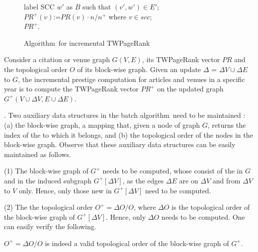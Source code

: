 \begin{figure}[tb!]
\begin{center}
{\begin{minipage}{3.36in}
{\icc\>\>\> label SCC $w'$ as $B$ such that $(v',w')\in E'$;\\
\icc\>\> \Else $PR^+(v)$:=$PR(v)\cdot {n}/{n^+}$ where $v\in scc$; \\
\icc\> \Return $PR^+$.
}
\vspace{-2.5ex} \myhrule
\end{minipage}
}
\end{center}
\vspace{-3ex}
\caption{\small Algorithm~\inctwprscc for incremental TWPageRank} \label{alg-inctwprscc}
\vspace{-3ex}
\end{figure}

Consider a citation or venue graph $G(V, E)$, its TWPageRank vector $PR$ and the topological order $O$ of its block-wise graph. Given an update $\Delta$ = $\Delta V\cup\Delta E$ to $G$, the incremental prestige computation for articles and venues in a specific year is to compute the TWPageRank vector $PR^+$ on the updated graph $G^+(V\cup\Delta V, E\cup\Delta E)$.


.
Two auxiliary data structures in the batch algorithm~\twprscc need to be maintained : (a) the block-wise graph,  a mapping that, given a node of graph $G$, returns the index of the \scc to which it belongs, and (b) the topological order of the nodes in the block-wise graph.
%
Observe that these auxiliary data structures can be easily maintained as follows.



\sstab(1) The block-wise graph of $G^+$ needs to be computed, whose \sccs consist of the \sccs in $G$ and \sccs in the induced subgraph $G^+[\Delta V]$, as  the edges $\Delta E$ are  on $\Delta V$ and from $\Delta V$  to $V$ only. Hence, only those new \sccs in $G^+[\Delta V]$ need to be computed.

\sstab(2) The the topological order $O^+=\Delta O/O$, where $\Delta O$ is the topological order of the block-wise graph of $G^+[\Delta V]$. Hence, only $\Delta O$ needs to be computed. One can easily verify the following.


\begin{prop} \label{lemma-inc-topo}
 $O^+=\Delta O/O$ is indeed a valid topological order of the block-wise graph of $G^+$.
\end{prop}

